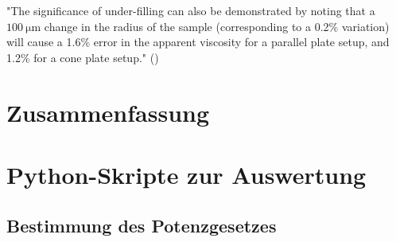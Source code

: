 \documentclass[11pt,a4paper,oneside]{scrartcl}
\begin{document}
"The significance of under-filling can also be demonstrated by
noting that a $100\ \mathrm{\mu m}$ change in the radius of the sample (corresponding to a 0.2\% variation) will cause a 1.6\% error in the
apparent viscosity for a parallel plate setup, and 1.2\% for a
cone plate setup." (\cite{Hellström_2015})

\section{Zusammenfassung}
\newpage

 

\appendix



\section{Python-Skripte zur Auswertung}
\subsection{Bestimmung des Potenzgesetzes}
%
\end{document}
